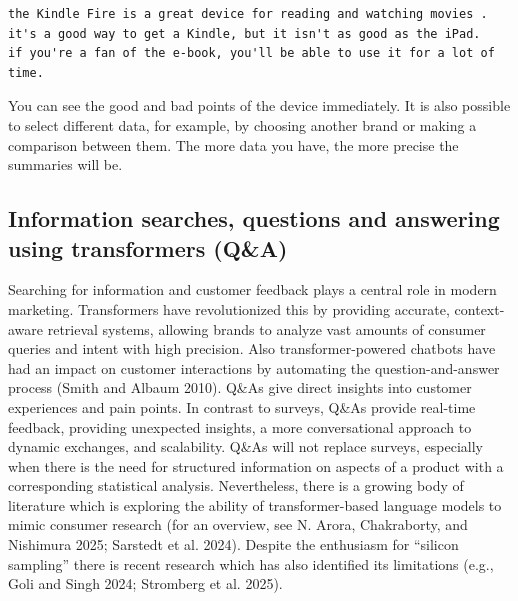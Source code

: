 \begin{Shaded}
\begin{Highlighting}[]
\NormalTok{(ts[[}\NormalTok{,}\NormalTok{]])}
\end{Highlighting}
\end{Shaded}

\begin{verbatim}
the Kindle Fire is a great device for reading and watching movies . 
it's a good way to get a Kindle, but it isn't as good as the iPad. 
if you're a fan of the e-book, you'll be able to use it for a lot of time.
\end{verbatim}

You can see the good and bad points of the device immediately. It is also possible to select different data, for example, by choosing another brand or making a
comparison between them. The more data you have, the more precise the
summaries will be.

\subsection{Information searches, questions and answering using
transformers
(Q\&A)}\label{information-search-question-and-answering-using-transformers-qa}

Searching for information and customer feedback plays a central role in modern
marketing. Transformers have revolutionized this by providing
accurate, context-aware retrieval systems, allowing brands to analyze vast
amounts of consumer queries and intent with high precision. Also
transformer-powered chatbots have had an impact on customer interactions by
automating the question-and-answer process
(Smith and Albaum 2010). Q\&As give direct insights into customer
experiences and pain points. In contrast to surveys, Q\&As
provide real-time feedback, providing unexpected insights, a
more conversational approach to dynamic exchanges, and
scalability. Q\&As will not replace surveys, especially when there is
the need for structured information on aspects of a product with a
corresponding statistical analysis. Nevertheless, there is a growing
body of literature which is exploring the ability of transformer-based
language models to mimic consumer research (for an overview, see N.
Arora, Chakraborty, and Nishimura 2025; Sarstedt et al. 2024).
Despite the enthusiasm for ``silicon sampling'' there is recent research
which has also identified its limitations (e.g., Goli and Singh 2024;
Stromberg et al. 2025).

